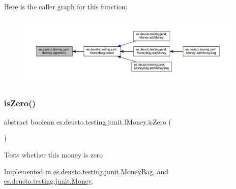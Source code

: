 Here is the caller graph for this function\+:
\nopagebreak
\begin{figure}[H]
\begin{center}
\leavevmode
\includegraphics[width=350pt]{interfacees_1_1deusto_1_1testing_1_1junit_1_1_i_money_ae45bc758e69a0017f083f11d050c53cb_icgraph}
\end{center}
\end{figure}
\mbox{\label{interfacees_1_1deusto_1_1testing_1_1junit_1_1_i_money_a166c39b6f931e49769580a04f8c73500}} 
\subsubsection{\texorpdfstring{is\+Zero()}{isZero()}}
{\footnotesize\ttfamily abstract boolean es.\+deusto.\+testing.\+junit.\+I\+Money.\+is\+Zero (\begin{DoxyParamCaption}{ }\end{DoxyParamCaption})\hspace{0.3cm}{\ttfamily [abstract]}}

Tests whether this money is zero 

Implemented in \hyperlink{classes_1_1deusto_1_1testing_1_1junit_1_1_money_bag_abebc5bc39c3343cb3c4e5fb291fd5893}{es.\+deusto.\+testing.\+junit.\+Money\+Bag}, and \hyperlink{classes_1_1deusto_1_1testing_1_1junit_1_1_money_a797658a03260b535e9a36ebbcc3b19c9}{es.\+deusto.\+testing.\+junit.\+Money}.

\mbox{\label{interfacees_1_1deusto_1_1testing_1_1junit_1_1_i_money_a09154f9713133d4734f72d6a20081209}} 
